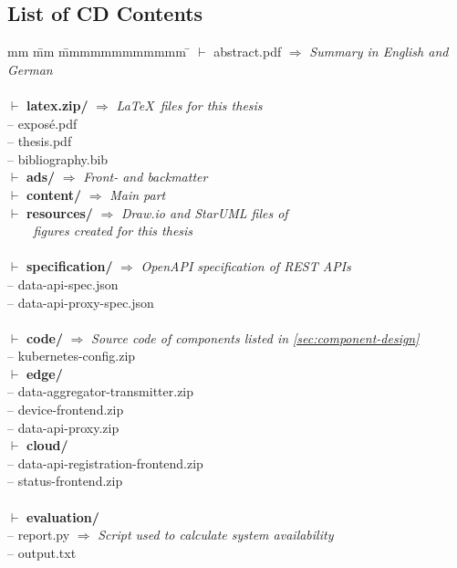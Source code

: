 \begin{appendices}

\FloatBarrier


\chapter{List of CD Contents}
\label{app:cd-contents}

\begin{tabbing}
	mm \= mm \= mmmmmmmmmmmm \= \kill
	$\vdash$ abstract.pdf 						\> \> \> $\Rightarrow$ \textit{Summary in English and German} \\
	\\
	$\vdash$ \textbf{latex.zip/} 				\> \> \> $\Rightarrow$ \textit{\LaTeX~files for this thesis} \\
	\> -- exposé.pdf \\
	\> -- thesis.pdf \\
	\> -- bibliography.bib \\
	\> $\vdash$ \textbf{ads/}   			\> \> $\Rightarrow$ \textit{Front- and backmatter} \\
	\> $\vdash$ \textbf{content/}   		\> \> $\Rightarrow$ \textit{Main part} \\
	\> $\vdash$ \textbf{resources/}   		\> \> $\Rightarrow$ \textit{Draw.io and StarUML files of} \\
											\> \> \> 			\textit{~~~~figures created for this thesis} \\
	\\
	$\vdash$ \textbf{specification/} 		\> \> \> $\Rightarrow$ \textit{OpenAPI specification of \acs{REST} \acsp{API}} \\
	\> -- data-api-spec.json \\
	\> -- data-api-proxy-spec.json \\
	\\
	$\vdash$ \textbf{code/} 				\> \> \> $\Rightarrow$ \textit{Source code of components listed in \autoref{sec:component-design}} \\
	\> -- kubernetes-config.zip \\
	\> $\vdash$ \textbf{edge/} \\
	\> \> -- data-aggregator-transmitter.zip \\
	\> \> -- device-frontend.zip \\
	\> \> -- data-api-proxy.zip \\
	\> $\vdash$ \textbf{cloud/} \\
	\> \> -- data-api-registration-frontend.zip \\
	\> \> -- status-frontend.zip \\
	\\
	$\vdash$ \textbf{evaluation/} \\ 			
	\> -- report.py 						\> \> $\Rightarrow$ \textit{Script used to calculate system availability} \\
	\> -- output.txt \\
\end{tabbing}

\end{appendices}
